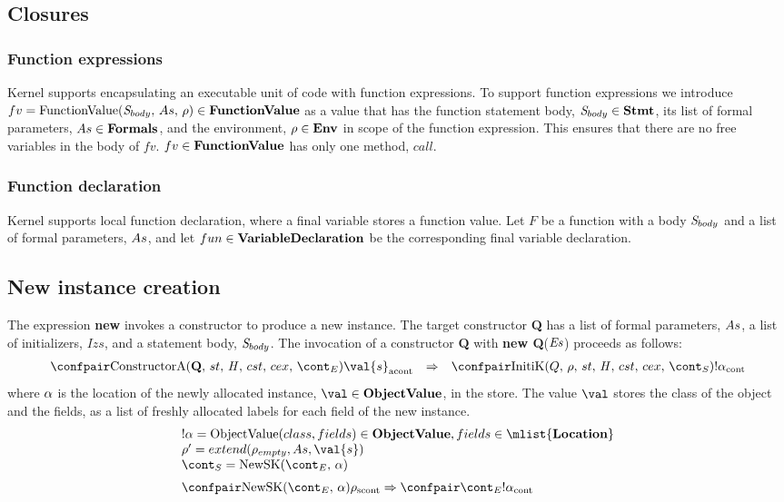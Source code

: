 \documentclass{article}
\begin{document}
\subsection{Closures}
\subsubsection{Function expressions}

Kernel supports encapsulating an executable unit of code with function expressions. To support function expressions we introduce $fv = \mathrm{FunctionValue}({\mathit{S}_{body}},\,{As},\,{\rho}) \in \mathbf{FunctionValue}$ as a value that has the function statement body, $\mathit{S}_{body} \in \mathbf{Stmt}$, its list of formal parameters, $As \in \mathbf{Formals}$, and the environment, $\rho \in \mathbf{Env}$ in scope of the function expression. This ensures that there are no free variables in the body of $fv$. $fv \in \mathbf{FunctionValue}$ has only one method, $call$.

\subsubsection{Function declaration}
Kernel supports local function declaration, where a final variable stores a function value. 
Let $F$ be a function with a body $\mathit{S}_{body}$ and a list of formal parameters, $As$, and let $fun \in \mathbf{VariableDeclaration}$ be the corresponding final variable declaration.

\subsection{New instance creation}

The expression \textbf{new} invokes a constructor to produce a new instance. The target constructor \textbf{Q} has a list of formal parameters, $As$, a list of initializers, $Izs$, and a statement body, $\mathit{S}_{body}$. The invocation of a constructor \textbf{Q} with \textbf{new Q}($\mathit{E}\mathit{s}$) proceeds as follows:
\[
  \begin{array}{lcl}
	\acontconf{\ConstructorA{\textbf{Q}}{\econt}}{\val{s}}
	& \Rightarrow &
	\contconf{\InitK{Q}{\env}{\scont}}{!\loc}
  \end{array}
\]
\noindent
where $\alpha$ is the location of the newly allocated instance, $\val \in \dobjval$, in the store. The value $\val$ stores the class of the object and the fields, as a list of freshly allocated labels for each field of the new instance.
\[
  \begin{array}{l}
	\deref{\loc} = \objval \in \dobjval, fields \in \mlist{\dlocation}\\
	\env' = extend(\env_{empty}, \formals, \val{s})\\
	\scont = \NewSK{\econt}{\loc} \\[2mm]

	\scontconf{\NewSK{\econt}{\loc}}{\env}
	\Rightarrow
	\contconf{\econt}{\deref{\loc}}
  \end{array}
\]
\end{document}
